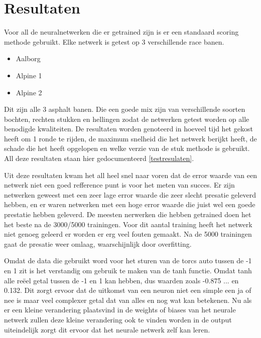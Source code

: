 \documentclass{article}
\begin{document}
\section{Resultaten}
Voor all de neuralnetwerken die er getrained zijn is er een standaard scoring methode gebruikt. Elke netwerk is getest op 3 verschillende race banen.
\begin{itemize}
\item Aalborg
\item Alpine 1
\item Alpine 2
\end{itemize}
Dit zijn alle 3 asphalt banen. Die een goede mix zijn van verschillende soorten bochten, rechten stukken en hellingen zodat de netwerken getest worden op alle benodigde kwaliteiten. De resultaten worden genoteerd in hoeveel tijd het gekost heeft om 1 ronde te rijden, de maximum snelheid die het netwerk berijkt heeft, de schade die het heeft opgelopen en welke verzie van de stuk methode is gebruikt. All deze resultaten staan hier gedocumenteerd \ref{testresulaten}.

Uit deze resultaten kwam het all heel snel naar voren dat de error waarde van een netwerk niet een goed refference punt is voor het meten van succes. Er zijn netwerken geweest met een zeer lage error waarde die zeer slecht presatie geleverd hebben, en er waren netwerken met een hoge error waarde die juist wel een goede prestatie hebben geleverd. De meesten nerwerken die hebben getrained doen het het beste na de 3000/5000 trainingen. Voor dit aantal training heeft het netwerk niet genoeg geleerd er worden er erg veel fouten gemaakt. Na de 5000 trainingen gaat de presatie weer omlaag, waarschijnlijk door overfitting.

Omdat de data die gebruikt word voor het sturen van de torcs auto tussen de -1 en 1 zit is het verstandig om gebruik te maken van de tanh functie. Omdat tanh alle reëel getal tussen de -1 en 1 kan hebben, dus waarden zoals -0.875 ... en 0.132. Dit zorgt ervoor dat de uitkomst van een neuron niet een simple een ja of nee is maar veel complexer getal dat van alles en nog wat kan betekenen. Nu als er een kleine verandering plaatsvind in de weights of biases van het neurale netwerk zullen deze kleine verandering ook te vinden worden in de output uiteindelijk zorgt dit ervoor dat het neurale netwerk zelf kan leren.\\\\
\end{document}
